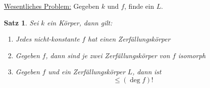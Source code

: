 \documentclass[a4paper,12pt,numbers=noenddot,parskip=full]{scrartcl}
\newcommand{\heading}{\underline}
\theoremstyle{dotless}
\newtheorem{theorem}{Satz}[section]
\theoremstyle{remark}
\begin{document}
	\heading{Wesentliches Problem:} Gegeben $k$ und $f$, finde ein $L$.
	
	\begin{theorem}
		Sei $k$ ein Körper, dann gilt:
		\begin{enumerate}
			\item Jedes nicht-konstante $f$ hat einen Zerfällungskörper
			\item Gegeben $f$, dann sind je zwei Zerfällungskörper von $f$ isomorph
			\item Gegeben $f$ und ein Zerfällungskörper $L$, dann ist
			\begin{equation*}
				[L:k] \leq (\deg f)!
			\end{equation*}
		\end{enumerate}
	\end{theorem}
\end{document}
